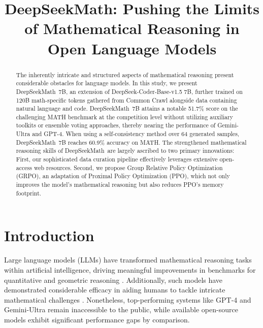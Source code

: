 \title{DeepSeekMath: Pushing the Limits of Mathematical Reasoning in Open Language Models}

\begin{abstract}
The inherently intricate and structured aspects of mathematical reasoning present considerable obstacles for language models. In this study, we present DeepSeekMath~7B, an extension of DeepSeek-Coder-Base-v1.5 7B, further trained on 120B math-specific tokens gathered from Common Crawl alongside data containing natural language and code. DeepSeekMath~7B attains a notable 51.7\% score on the challenging MATH benchmark at the competition level without utilizing auxiliary toolkits or ensemble voting approaches, thereby nearing the performance of Gemini-Ultra and GPT-4. When using a self-consistency method over 64 generated samples, DeepSeekMath~7B reaches 60.9\% accuracy on MATH. The strengthened mathematical reasoning skills of DeepSeekMath~are largely ascribed to two primary innovations: First, our sophisticated data curation pipeline effectively leverages extensive open-access web resources. Second, we propose Group Relative Policy Optimization (GRPO), an adaptation of Proximal Policy Optimization (PPO), which not only improves the model’s mathematical reasoning but also reduces PPO’s memory footprint.
\end{abstract}

\section{Introduction}

Large language models (LLMs) have transformed mathematical reasoning tasks within artificial intelligence, driving meaningful improvements in benchmarks for quantitative \citep{MATH} and geometric reasoning \citep{trinh2024solving}. Additionally, such models have demonstrated considerable efficacy in aiding humans to tackle intricate mathematical challenges \citep{tao}. Nonetheless, top-performing systems like GPT-4 \citep{gpt4} and Gemini-Ultra \citep{gemini} remain inaccessible to the public, while available open-source models exhibit significant performance gaps by comparison.

